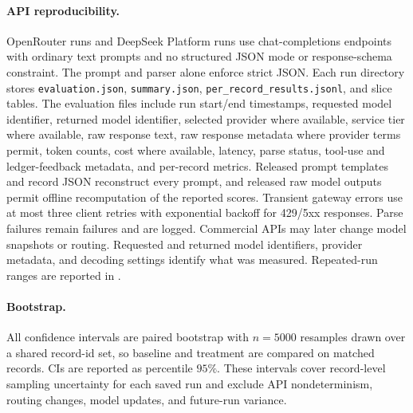 \paragraph{API reproducibility.}
OpenRouter runs and DeepSeek Platform runs use chat-completions endpoints with ordinary text prompts and no structured JSON mode or response-schema constraint. The prompt and parser alone enforce strict JSON. Each run directory stores \texttt{evaluation.json}, \texttt{summary.json}, \texttt{per\_record\_results.jsonl}, and slice tables. The evaluation files include run start/end timestamps, requested model identifier, returned model identifier, selected provider where available, service tier where available, raw response text, raw response metadata where provider terms permit, token counts, cost where available, latency, parse status, tool-use and ledger-feedback metadata, and per-record metrics. Released prompt templates and record JSON reconstruct every prompt, and released raw model outputs permit offline recomputation of the reported scores. Transient gateway errors use at most three client retries with exponential backoff for 429/5xx responses. Parse failures remain failures and are logged. Commercial APIs may later change model snapshots or routing. Requested and returned model identifiers, provider metadata, and decoding settings identify what was measured. Repeated-run ranges are reported in .

\paragraph{Bootstrap.}
All confidence intervals are paired bootstrap with $n{=}5000$ resamples drawn over a shared record-id set, so baseline and treatment are compared on matched records. CIs are reported as percentile $95\%$. These intervals cover record-level sampling uncertainty for each saved run and exclude API nondeterminism, routing changes, model updates, and future-run variance.

